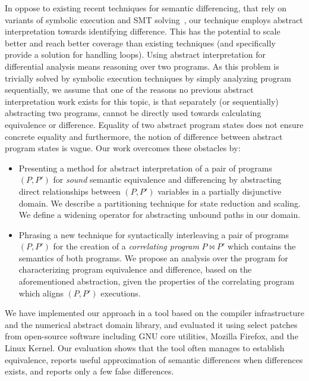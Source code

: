 In oppose to existing recent techniques for semantic differencing, that rely on variants of symbolic execution and SMT solving~\cite{DwyerElbaumPerson08,GodlinStrichman09,EnglerRamos11,HawblitzelKawaguchiLahiriRebelo12}, our technique employs abstract interpretation towards identifying difference. This has the potential to scale better and reach better coverage than existing techniques (and specifically provide a solution for handling loops). Using abstract interpretation for differential analysis means reasoning over two programs. As this problem is trivially solved by symbolic execution techniques by simply analyzing program sequentially, we assume that one of the reasons no previous abstract interpretation work exists for this topic, is that separately (or sequentially) abstracting two programs, cannot be directly used towards calculating equivalence or difference. Equality of two abstract program states does not ensure concrete equality and furthermore, the notion of difference between abstract program states is vague.
Our work overcomes these obstacles by:
\begin{itemize}
\item Presenting a method for abstract interpretation of a pair of programs $(P,P')$ for \emph{sound} semantic equivalence and differencing by abstracting direct relationships between $(P,P')$ variables in a partially disjunctive domain. We describe a partitioning technique for state reduction and scaling. We define a widening operator for abstracting unbound paths in our domain.
\item Phrasing a new technique for syntactically interleaving a pair of programs $(P,P')$ for the creation of a \emph{correlating program} $P \bowtie P'$ which contains the semantics of both programs. We propose an analysis over the program for characterizing program equivalence and difference, based on the aforementioned abstraction, given the properties of the correlating program which aligns $(P,P')$ executions.
\end{itemize}

We have implemented our approach in a tool based on the  compiler infrastructure and the  numerical abstract domain library, and evaluated it using select patches from open-source software including GNU core utilities, Mozilla Firefox, and the Linux Kernel. Our evaluation shows that the tool often manages to establish equivalence, reports useful approximation of semantic differences when differences exists, and reports only a few false differences.


